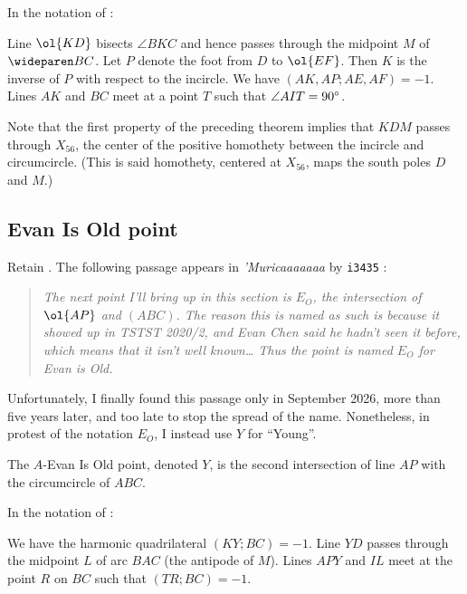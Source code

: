 \documentclass[11pt]{scrartcl}
\begin{document}
\begin{theorem}
  \label{thm:sharkydevil}
  In the notation of :
  \begin{enumerate}
    \ii Line $\ol{KD}$ bisects $\angle BKC$
    and hence passes through the midpoint $M$ of $\arc{BC}$.
    \ii Let $P$ denote the foot from $D$ to $\ol{EF}$.
    Then $K$ is the inverse of $P$ with respect to the incircle.
    \ii We have $(AK,AP;AE,AF) = -1$.
    \ii Lines $AK$ and $BC$ meet at a point $T$ such that $\angle AIT = 90^\circ$.
  \end{enumerate}
\end{theorem}
Note that the first property of the preceding theorem
implies that $KDM$ passes through $X_{56}$,
the center of the positive homothety between the incircle and circumcircle.
(This is said homothety, centered at $X_{56}$, maps the south poles $D$ and $M$.)

\subsection{Evan Is Old point}
Retain .
The following passage appears in \emph{’Muricaaaaaaa} by \texttt{i3435} \cite{M21}:
\begin{quote}
  \slshape
  The next point I'll bring up in this section is $E_O$,
  the intersection of $\ol{AP}$ and $(ABC)$.
  The reason this is named as such is because it showed up in TSTST 2020/2,
  and Evan Chen said he hadn't seen it before, which means that it isn't well known\dots
  Thus the point is named $E_O$ for Evan is Old.
\end{quote}
Unfortunately, I finally found this passage only in September 2026,
more than five years later, and too late to stop the spread of the name.
Nonetheless, in protest of the notation $E_O$, I instead use $Y$ for ``Young''.
\begin{definition}
  The \alert{$A$-Evan Is Old point}, denoted $Y$, is the second intersection
  of line $AP$ with the circumcircle of $ABC$.
\end{definition}

\begin{theorem}
  \label{thm:evanisold}
  In the notation of :
  \begin{enumerate}
    \ii We have the harmonic quadrilateral $(KY;BC) = -1$.
    \ii Line $YD$ passes through the midpoint $L$ of arc $BAC$ (the antipode of $M$).
    \ii Lines $APY$ and $IL$ meet at the point $R$ on $BC$ such that $(TR;BC) = -1$.
  \end{enumerate}
\end{theorem}
\end{document}
